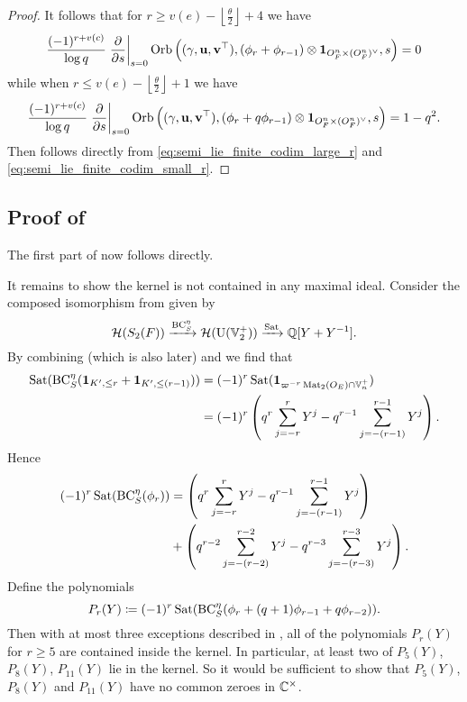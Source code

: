 \begin{proof}
  It follows that for $r \ge v(e) - \left\lfloor \frac{\theta}{2} \right\rfloor + 4$ we have
  \begin{equation}
    \frac{(-1)^{r+v(c)}}{\log q}
    \left. \pdv{}{s} \right\rvert_{s=0}
    \operatorname{Orb} \left( {(\gamma, \mathbf u, \mathbf v^\top)}, (\phi_r + \phi_{r-1}) \otimes \mathbf{1}_{O_F^n \times (O_F^n)^\vee}, s \right)
    = 0
    \label{eq:semi_lie_finite_codim_large_r}
  \end{equation}
  while when $r \le v(e) - \left\lfloor \frac{\theta}{2} \right\rfloor + 1$ we have
  \begin{equation}
    \frac{(-1)^{r+v(c)}}{\log q}
    \left. \pdv{}{s} \right\rvert_{s=0}
    \operatorname{Orb} \left( {(\gamma, \mathbf u, \mathbf v^\top)}, (\phi_r + q\phi_{r-1}) \otimes \mathbf{1}_{O_F^n \times (O_F^n)^\vee}, s \right)
    = 1-q^2.
    \label{eq:semi_lie_finite_codim_small_r}
  \end{equation}
  Then  follows directly
  from \eqref{eq:semi_lie_finite_codim_large_r} and \eqref{eq:semi_lie_finite_codim_small_r}.
\end{proof}

\subsection{Proof of }
The first part of  now follows directly.

It remains to show the kernel is not contained in any maximal ideal.
Consider the composed isomorphism from 
given by
\[ \mathcal H(S_2(F)) \xrightarrow{\operatorname{BC}^\eta_S} \mathcal H(\operatorname{U}(\mathbb V_2^+)) \xrightarrow{\operatorname{Sat}} \mathbb Q[Y + Y^{-1}]. \]
By combining \cite[Equation (7.1.9)]{ref:AFLspherical}
(which is also  later)
and \cite[Equation (7.1.4)]{ref:AFLspherical}
we find that
\begin{align*}
  \operatorname{Sat}(\operatorname{BC}^\eta_S(\mathbf{1}_{K', \le r} + \mathbf{1}_{K', \le (r-1)}))
  &= (-1)^r \operatorname{Sat}(\mathbf{1}_{\varpi^{-r} \operatorname{Mat}_2(O_E) \cap \mathbb V_n^+}) \\
  &= (-1)^r \left( q^r \sum_{j=-r}^r Y^j - q^{r-1} \sum_{j=-(r-1)}^{r-1} Y^j \right).
\end{align*}
Hence
\begin{align*}
  (-1)^r \operatorname{Sat}(\operatorname{BC}^\eta_S(\phi_r))
  &= \left( q^r \sum_{j=-r}^r Y^j - q^{r-1} \sum_{j=-(r-1)}^{r-1} Y^j \right) \\
  &+ \left( q^{r-2} \sum_{j=-(r-2)}^{r-2} Y^j - q^{r-3} \sum_{j=-(r-3)}^{r-3} Y^j \right).
\end{align*}
Define the polynomials
\[ P_r(Y) \coloneqq (-1)^r \operatorname{Sat}(\operatorname{BC}^\eta_S(\phi_r + (q+1) \phi_{r-1} + q \phi_{r-2})). \]
Then with at most three exceptions described in ,
all of the polynomials $P_r(Y)$ for $r \ge 5$ are contained inside the kernel.
In particular, at least two of $P_5(Y)$, $P_8(Y)$, $P_{11}(Y)$ lie in the kernel.
So it would be sufficient to show that $P_5(Y)$, $P_8(Y)$ and $P_{11}(Y)$
have no common zeroes in $\mathbb C^\times$.
